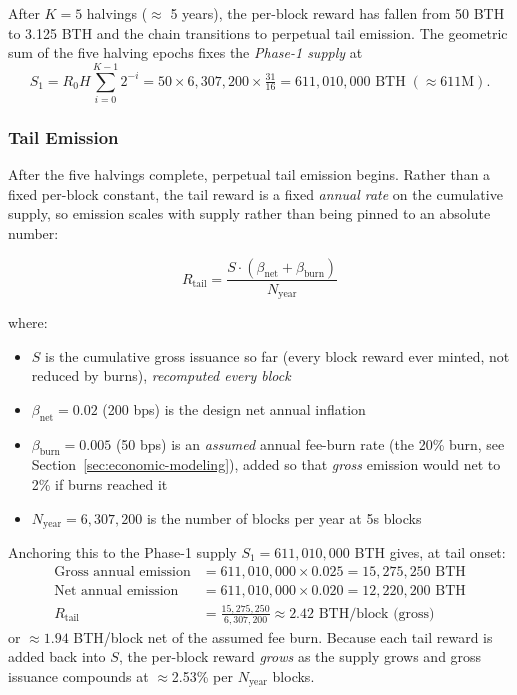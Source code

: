 After $K = 5$ halvings ($\approx$ 5 years), the per-block reward has fallen
from 50 BTH to 3.125 BTH and the chain transitions to perpetual tail
emission. The geometric sum of the five halving epochs fixes the
\emph{Phase-1 supply} at
\begin{equation}
S_1 = R_0 H \sum_{i=0}^{K-1} 2^{-i}
    = 50 \times 6{,}307{,}200 \times \tfrac{31}{16}
    = 611{,}010{,}000 \text{ BTH} \;(\approx 611\text{M}).
\end{equation}



\subsubsection{Tail Emission}

After the five halvings complete, perpetual tail emission begins. Rather than
a fixed per-block constant, the tail reward is a fixed \emph{annual rate} on
the cumulative supply, so emission scales with supply rather than being pinned
to an absolute number:

\begin{equation}
R_{\text{tail}} = \frac{S \cdot (\beta_{\text{net}} + \beta_{\text{burn}})}
                       {N_{\text{year}}}
\end{equation}

where:
\begin{itemize}
  \item $S$ is the cumulative gross issuance so far (every block reward ever
    minted, not reduced by burns), \emph{recomputed every block}
  \item $\beta_{\text{net}} = 0.02$ (200 bps) is the design net annual
    inflation
  \item $\beta_{\text{burn}} = 0.005$ (50 bps) is an \emph{assumed} annual
    fee-burn rate (the 20\% burn, see Section~\ref{sec:economic-modeling}),
    added so that \emph{gross} emission would net to 2\% if burns reached it
  \item $N_{\text{year}} = 6{,}307{,}200$ is the number of blocks per year at
    5s blocks
\end{itemize}

Anchoring this to the Phase-1 supply $S_1 = 611{,}010{,}000$ BTH gives, at
tail onset:
\begin{align}
\text{Gross annual emission} &= 611{,}010{,}000 \times 0.025 = 15{,}275{,}250 \text{ BTH} \\
\text{Net annual emission}   &= 611{,}010{,}000 \times 0.020 = 12{,}220{,}200 \text{ BTH} \\
R_{\text{tail}} &= \frac{15{,}275{,}250}{6{,}307{,}200} \approx 2.42 \text{ BTH/block (gross)}
\end{align}
or $\approx 1.94$ BTH/block net of the assumed fee burn. Because each tail
reward is added back into $S$, the per-block reward \emph{grows} as the supply
grows and gross issuance compounds at $\approx$2.53\% per $N_{\text{year}}$
blocks.

